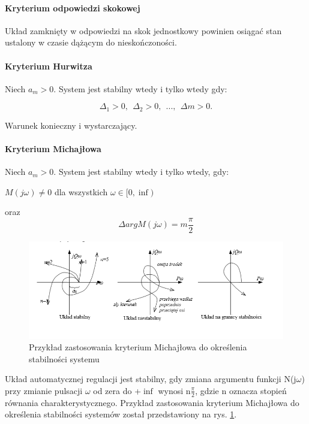 \documentclass[a4paper,twoside]{report}
\begin{document}
\paragraph{Kryterium odpowiedzi skokowej\\}

Układ zamknięty w odpowiedzi na skok jednostkowy powinien osiągać stan ustalony w czasie dążącym do nieskończoności.

\paragraph{Kryterium Hurwitza\\}
Niech $ a_{m}>0$. System jest stabilny wtedy i tylko wtedy gdy:
\begin{center}
	$$\Delta_{1}>0,~~\Delta_{2}>0,~~...,~~\Delta{m}>0.$$
\end{center}
Warunek konieczny i wystarczający.
\paragraph{Kryterium Michajłowa\\}
Niech $ a_{m}>0$. System jest stabilny wtedy i tylko wtedy, gdy:
	\begin{center}
	$ M(j\omega)\neq 0$ dla wszystkich $\omega \in [0,\inf) $
	\end{center}
oraz
	$$\Delta arg M(j\omega)= m\frac{\pi}{2}  $$

\begin{figure}[htbp]
	\centering
	\includegraphics[scale=0.7]{obrazy/dynamiczne/Michajlow_przyklad.png}
	\caption{Przykład zastosowania kryterium Michajłowa do określenia stabilności systemu}
	\label{rys:dynamiczne_kryterium_michajlowa}
\end{figure}
Układ automatycznej regulacji jest stabilny, gdy zmiana argumentu funkcji N(j$\omega$) przy zmianie pulsacji $\omega$
od zera do +$\inf$ wynosi n$\frac{\pi}{2}$, gdzie n oznacza stopień równania charakterystycznego. Przykład zastosowania kryterium Michajłowa do określenia stabilności systemów został przedstawiony na rys. \ref{rys:dynamiczne_kryterium_michajlowa}.
\end{document}
